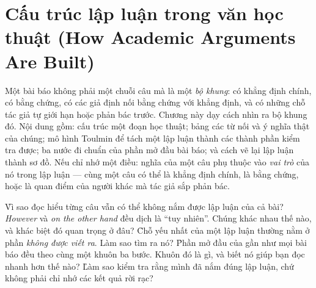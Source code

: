 \documentclass[../../english.tex]{subfiles}
\begin{document}
\chapter{Cấu trúc lập luận trong văn học thuật (How Academic Arguments Are Built)}

\begin{tomtat}
Một bài báo không phải một chuỗi câu mà là một \emph{bộ khung}: có khẳng định chính, có bằng chứng, có các giả định nối bằng chứng với khẳng định, và có những chỗ tác giả tự giới hạn hoặc phản bác trước. Chương này dạy cách nhìn ra bộ khung đó. Nội dung gồm: cấu trúc một đoạn học thuật; bảng các từ nối và ý nghĩa thật của chúng; mô hình Toulmin để tách một lập luận thành các thành phần kiểm tra được; ba nước đi chuẩn của phần mở đầu bài báo; và cách vẽ lại lập luận thành sơ đồ. Nếu chỉ nhớ một điều: nghĩa của một câu phụ thuộc vào \emph{vai trò} của nó trong lập luận --- cùng một câu có thể là khẳng định chính, là bằng chứng, hoặc là quan điểm của người khác mà tác giả sắp phản bác.
\end{tomtat}

\begin{nentang}
\end{nentang}

\begin{khoigoi}
\h{Vì sao đọc hiểu từng câu vẫn có thể không nắm được lập luận của cả bài?}
\h{\emph{However} và \emph{on the other hand} đều dịch là ``tuy nhiên''. Chúng khác nhau thế nào, và khác biệt đó quan trọng ở đâu?}
\h{Chỗ yếu nhất của một lập luận thường nằm ở phần \emph{không được viết ra}. Làm sao tìm ra nó?}
\h{Phần mở đầu của gần như mọi bài báo đều theo cùng một khuôn ba bước. Khuôn đó là gì, và biết nó giúp bạn đọc nhanh hơn thế nào?}
\h{Làm sao kiểm tra rằng mình đã nắm đúng lập luận, chứ không phải chỉ nhớ các kết quả rời rạc?}
\end{khoigoi}
\end{document}
